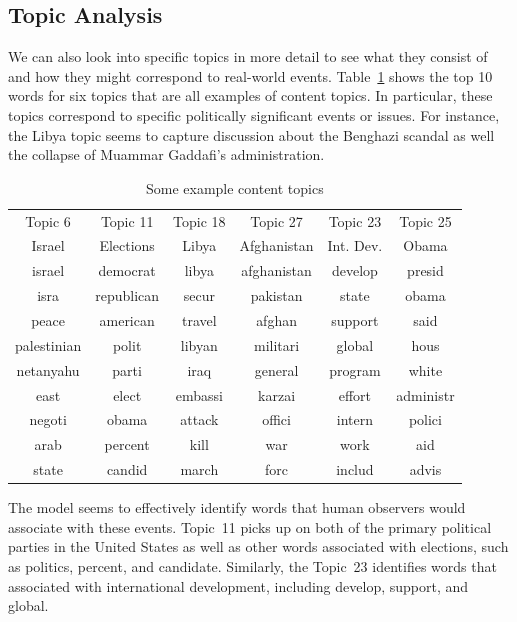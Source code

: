 \documentclass[12pt]{article}
\theoremstyle{definition}
\theoremstyle{algodesc}
\begin{document}
\subsection{Topic Analysis}
We can also look into specific topics in more detail to see what they consist of and how they might correspond to real-world events. Table~\ref{tab:content_topics} shows the top 10 words for six topics that are all examples of content topics. In particular, these topics correspond to specific politically significant events or issues. For instance, the Libya topic seems to capture discussion about the Benghazi scandal as well the collapse of Muammar Gaddafi's administration.

\begin{table}[h] \centering
\begin{tabular}{cccccc}
  \toprule
  Topic 6     & Topic 11   & Topic 18 & Topic 27    & Topic 23  & Topic 25 \\
  Israel      & Elections  & Libya    & Afghanistan & Int. Dev. & Obama \\
  \midrule
  israel      & democrat   & libya    & afghanistan & develop   & presid \\
  isra        & republican & secur    & pakistan    & state     & obama \\
  peace       & american   & travel   & afghan      & support   & said \\
  palestinian & polit      & libyan   & militari    & global    & hous \\
  netanyahu   & parti      & iraq     & general     & program   & white \\
  east        & elect      & embassi  & karzai      & effort    & administr \\
  negoti      & obama      & attack   & offici      & intern    & polici \\
  arab        & percent    & kill     & war         & work      & aid \\
  state       & candid     & march    & forc        & includ    & advis \\
  \bottomrule
\end{tabular}
\caption{Some example content topics}
\label{tab:content_topics}
\end{table}

The model seems to effectively identify words that human observers would associate with these events. Topic~11 picks up on both of the primary political parties in the United States as well as other words associated with elections, such as politics, percent, and candidate. Similarly, the Topic~23 identifies words that associated with international development, including develop, support, and global.
\end{document}
